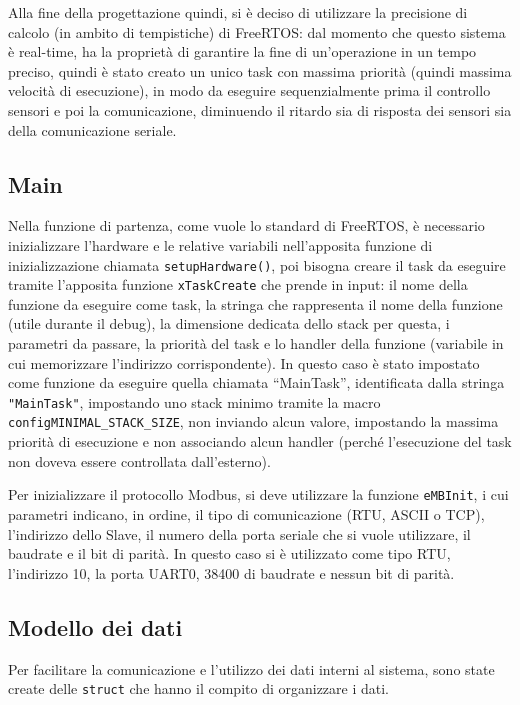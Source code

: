 \documentclass[a4paper,titlepage]{book}
\newcommand{\code}{\lstinline}
\begin{document}
Alla fine della progettazione quindi, si è deciso di utilizzare la precisione di calcolo (in ambito di tempistiche) di FreeRTOS: dal momento che questo sistema è real-time, ha la proprietà di garantire la fine di un'operazione in un tempo preciso, quindi è stato creato un unico task con massima priorità (quindi massima velocità di esecuzione), in modo da eseguire sequenzialmente prima il controllo sensori e poi la comunicazione, diminuendo il ritardo sia di risposta dei sensori sia della comunicazione seriale.

\subsection{Main}

Nella funzione di partenza, come vuole lo standard di FreeRTOS, è necessario inizializzare l'hardware e le relative variabili nell'apposita funzione di inizializzazione chiamata \lstinline !setupHardware()!, poi bisogna creare il task da eseguire tramite l'apposita funzione \code!xTaskCreate! che prende in input: il nome della funzione da eseguire come task, la stringa che rappresenta il nome della funzione (utile durante il debug), la dimensione dedicata dello stack per questa, i parametri da passare, la priorità del task e lo handler della funzione (variabile in cui memorizzare l'indirizzo corrispondente). In questo caso è stato impostato come funzione da eseguire quella chiamata ``MainTask'', identificata dalla stringa \lstinline!"MainTask"!, impostando uno stack minimo tramite la macro \lstinline!configMINIMAL_STACK_SIZE!, non inviando alcun valore, impostando la massima priorità di esecuzione e non associando alcun handler (perché l'esecuzione del task non doveva essere controllata dall'esterno).

Per inizializzare il protocollo Modbus, si deve utilizzare la funzione \code!eMBInit!, i cui parametri indicano, in ordine, il tipo di comunicazione (RTU, ASCII o TCP), l'indirizzo dello Slave, il numero della porta seriale che si vuole utilizzare, il baudrate e il bit di parità.
In questo caso si è utilizzato come tipo RTU, l'indirizzo 10, la porta UART0, 38400 di baudrate e nessun bit di parità.

\subsection{Modello dei dati}

Per facilitare la comunicazione e l'utilizzo dei dati interni al sistema, sono state create delle \lstinline!struct! che hanno il compito di organizzare i dati.
\end{document}
